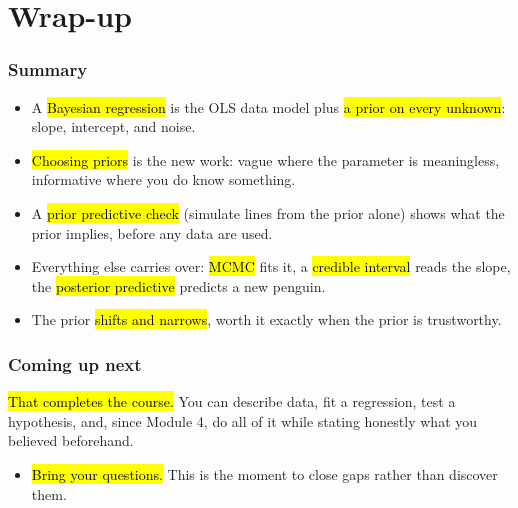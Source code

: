 \documentclass[slidestop,compress,mathserif]{beamer}
\begin{document}
\section{Wrap-up}

\begin{frame}
\frametitle{Summary}

\begin{itemize}
    \item A \hl{Bayesian regression} is the OLS data model plus \hl{a prior on every unknown}: slope, intercept, and noise.
    \pause
    \item \hl{Choosing priors} is the new work: vague where the parameter is meaningless, informative where you do know something.
    \pause
    \item A \hl{prior predictive check} (simulate lines from the prior alone) shows what the prior implies, before any data are used.
    \pause
    \item Everything else carries over: \hl{MCMC} fits it, a \hl{credible interval} reads the slope, the \hl{posterior predictive} predicts a new penguin.
    \pause
    \item The prior \hl{shifts and narrows}, worth it exactly when the prior is trustworthy.
\end{itemize}
\end{frame}

\begin{frame}
\frametitle{Coming up next}

\hl{That completes the course.} You can describe data, fit a regression, test a hypothesis, and, since Module 4, do all of it while stating honestly what you believed beforehand.

\vspace{0.4em}
\begin{itemize}
\item \hl{Bring your questions.} This is the moment to close gaps rather than discover them.
\end{itemize}
\end{frame}
\end{document}
